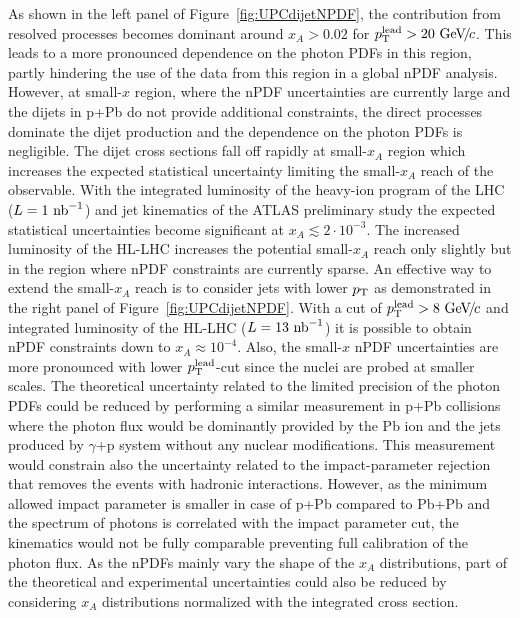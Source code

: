 \documentclass[../report.tex]{subfiles}
\begin{document}
As shown in the left panel of Figure~\ref{fig:UPCdijetNPDF}, the contribution from resolved processes becomes dominant around $x_A > 0.02$ for $p\sb{\scriptstyle\mathrm{T}}^{\mathrm{lead}}>20~\text{GeV}\!/\mspace{-2mu}c$. This leads to a more pronounced dependence on the photon PDFs in this region, partly hindering the use of the data from this region in a global nPDF analysis. However, at small-$x$ region, where the nPDF uncertainties are currently large and the dijets in p+Pb do not provide additional constraints, the direct processes dominate the dijet production and the dependence on the photon PDFs is negligible. The dijet cross sections fall off rapidly at small-$x_A$ region which increases the expected statistical uncertainty limiting the small-$x_A$ reach of the observable. With the integrated luminosity of the heavy-ion program of the LHC ($L=1~\text{nb}^{-1}$) and jet kinematics of the ATLAS preliminary study the expected statistical uncertainties become significant at $x_A \lesssim 2 \cdot 10^{-3}$. The increased luminosity of the HL-LHC increases the potential small-$x_A$ reach only slightly but in the region where nPDF constraints are currently sparse. An effective way to extend the small-$x_A$ reach is to consider jets with lower $p\sb{\scriptstyle\mathrm{T}}$ as demonstrated in the right panel of Figure~\ref{fig:UPCdijetNPDF}.
With a cut of $p\sb{\scriptstyle\mathrm{T}}^{\mathrm{lead}}>8~\text{GeV}\!/\mspace{-2mu}c$ and integrated luminosity of the HL-LHC ($L=13~\text{nb}^{-1}$) it is possible to obtain nPDF constraints down to $x_A \approx 10^{-4}$.  Also, the small-$x$ nPDF uncertainties are more pronounced with lower $p\sb{\scriptstyle\mathrm{T}}^{\mathrm{lead}}$-cut since the nuclei are probed at smaller scales. The theoretical uncertainty related to the limited precision of the photon PDFs could be reduced by performing a similar measurement in p+Pb collisions where the photon flux would be dominantly provided by the Pb ion and the jets produced by $\gamma$+p system without any nuclear modifications. This measurement would constrain also the uncertainty related to the impact-parameter rejection that removes the events with hadronic interactions. However, as the minimum allowed impact parameter is smaller in case of p+Pb compared to Pb+Pb and the spectrum of photons is correlated with the impact parameter cut, the kinematics would not be fully comparable preventing full calibration of the photon flux. As the nPDFs mainly vary the shape of the $x_A$ distributions, part of the theoretical and experimental uncertainties could also be reduced by considering $x_A$ distributions normalized with the integrated cross section.

\end{document}
